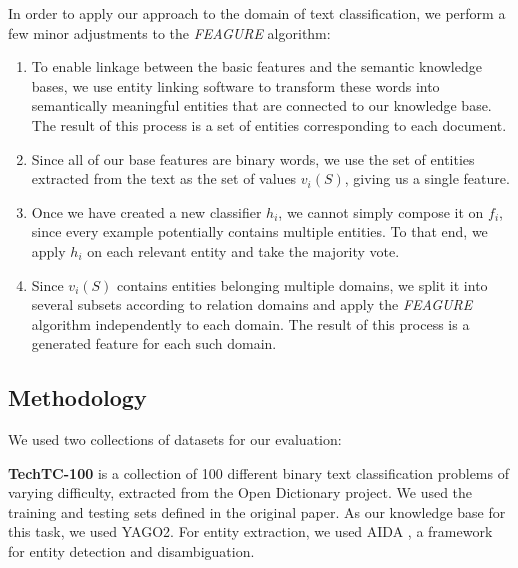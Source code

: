 \documentclass[twoside,11pt]{article}
\theoremstyle{definition}
\begin{document}
In order to apply our approach to the domain of text classification, we perform a few minor adjustments to the \emph{FEAGURE} algorithm:
\begin{enumerate}
	\item To enable linkage between the basic features and the semantic knowledge bases, we use entity linking software  to transform these words into semantically meaningful entities that are connected to our knowledge base. The result of this process is a set of entities corresponding to each document.
	\item Since all of our base features are binary words, we use the set of entities extracted from the text as the set of values $v_i(S)$, giving us a single feature.
	\item Once we have created a new classifier $h_i$, we cannot simply compose it on $f_i$, since every example potentially contains multiple entities. To that end, we apply $h_i$ on each relevant entity and take the majority vote.
	\item Since $v_i(S)$ contains entities belonging multiple domains,  we split it into several subsets according to relation domains and apply the \emph{FEAGURE} algorithm independently to each domain. The result of this process is a generated feature for each such domain.
\end{enumerate}

\subsection{Methodology}

We used two collections of datasets for our evaluation:

\textbf{TechTC-100} \cite{gabrilovich2004text} is a collection of 100 different binary text classification problems of varying difficulty, extracted from the Open Dictionary project.
We used the training and testing sets defined in the original paper. 
As our knowledge base for this task, we used YAGO2. %
For entity extraction, we used AIDA \cite{hoffart2011robust}, a framework for entity detection and disambiguation. 

\end{document}
